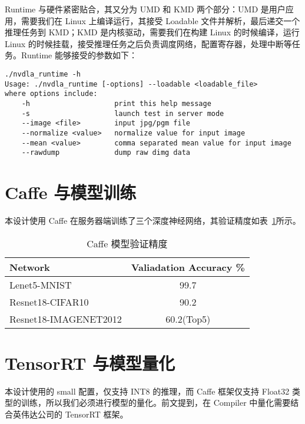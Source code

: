 Runtime 与硬件紧密贴合，其又分为 UMD 和 KMD 两个部分：UMD 是用户应用，需要我们在 Linux 上编译运行，其接受 Loadable 文件并解析，最后递交一个推理任务到 KMD；KMD 是内核驱动，需要我们在构建 Linux 的时候编译，运行 Linux 的时候挂载，接受推理任务之后负责调度网络，配置寄存器，处理中断等任务。Runtime 能够接受的参数如下：

\begin{lstlisting}
./nvdla_runtime -h
Usage: ./nvdla_runtime [-options] --loadable <loadable_file>
where options include:
    -h                    print this help message
    -s                    launch test in server mode
    --image <file>        input jpg/pgm file
    --normalize <value>   normalize value for input image
    --mean <value>        comma separated mean value for input image
    --rawdump             dump raw dimg data
\end{lstlisting}

\section{Caffe 与模型训练}

本设计使用 Caffe 在服务器端训练了三个深度神经网络，其验证精度如表~\ref{tab:Vertification}所示。

\begin{table}[!htbp]
    \caption{Caffe 模型验证精度}
    \label{tab:Vertification}
    \centering
    \footnotesize%
    \setlength{\tabcolsep}{4pt}%
    \renewcommand{\arraystretch}{1.2}%
    \begin{tabular}{lc}
        \toprule
        \textbf{Network}      & \multicolumn{1}{l}{\textbf{Valiadation Accuracy \%}}\\
        \midrule
        Lenet5-MNIST          & 99.7                                                \\
        Resnet18-CIFAR10      & 90.2                                                \\
        Resnet18-IMAGENET2012 & 60.2(Top5)                                          \\
        \bottomrule                   
    \end{tabular}
\end{table}

\section{TensorRT 与模型量化}

本设计使用的 small 配置，仅支持 INT8 的推理，而 Caffe 框架仅支持 Float32 类型的训练，所以我们必须进行模型的量化。前文提到，在 Compiler 中量化需要结合英伟达公司的 TensorRT 框架。

